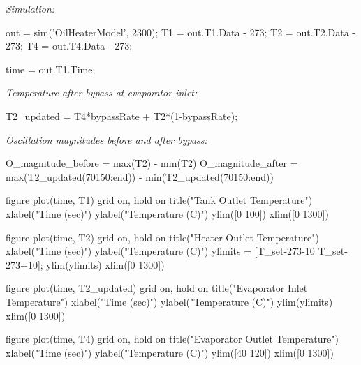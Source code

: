 \label{H_B8536940}

\begin{par}
\begin{flushleft}
\textit{Simulation:}
\end{flushleft}
\end{par}

\begin{matlabcode}
out = sim('OilHeaterModel', 2300);
T1 = out.T1.Data - 273;
T2 = out.T2.Data - 273;
T4 = out.T4.Data - 273;

time = out.T1.Time;
\end{matlabcode}

\begin{par}
\begin{flushleft}
\textit{Temperature after bypass at evaporator inlet:}
\end{flushleft}
\end{par}

\begin{matlabcode}
T2_updated = T4*bypassRate + T2*(1-bypassRate);
\end{matlabcode}

\begin{par}
\begin{flushleft}
\textit{Oscillation magnitudes before and after bypass:}
\end{flushleft}
\end{par}

\begin{matlabcode}
O_magnitude_before = max(T2) - min(T2)
O_magnitude_after = max(T2_updated(70150:end)) - min(T2_updated(70150:end))
\end{matlabcode}

\label{H_97B524D0}

\begin{matlabcode}
figure
plot(time, T1)
grid on, hold on
title("Tank Outlet Temperature")
xlabel("Time (sec)")
ylabel("Temperature (C)")
ylim([0 100])
xlim([0 1300])

figure
plot(time, T2)
grid on, hold on
title("Heater Outlet Temperature")
xlabel("Time (sec)")
ylabel("Temperature (C)")
ylimits = [T_set-273-10 T_set-273+10];
ylim(ylimits)
xlim([0 1300])

figure
plot(time, T2_updated)
grid on, hold on
title("Evaporator Inlet Temperature")
xlabel("Time (sec)")
ylabel("Temperature (C)")
ylim(ylimits)
xlim([0 1300])

figure
plot(time, T4)
grid on, hold on
title("Evaporator Outlet Temperature")
xlabel("Time (sec)")
ylabel("Temperature (C)")
ylim([40 120])
xlim([0 1300])
\end{matlabcode}

